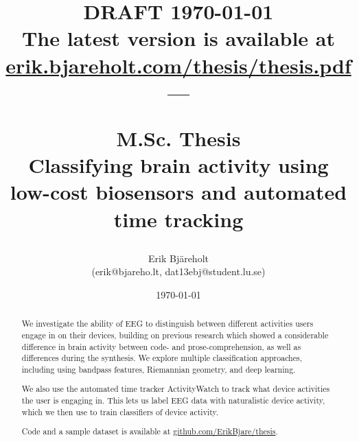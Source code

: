 \documentclass[a4paper]{article}
\title{%
    \small DRAFT \today \\
    \small The latest version is available at \href{https://erik.bjareholt.com/thesis/thesis.pdf}{erik.bjareholt.com/thesis/thesis.pdf}\\
    \large --- \\
    \large \par M.Sc. Thesis\\
    \huge Classifying brain activity using low-cost biosensors and automated time tracking \\
}
\author{Erik Bjäreholt \orcid{0000-0003-1350-9677} \\(erik@bjareho.lt, dat13ebj@student.lu.se)}
\date{\today}
\begin{document}
\maketitle

\begin{abstract}

    We investigate the ability of EEG to distinguish between different activities users engage in on their devices, building on previous research which showed a considerable difference in brain activity between code- and prose-comprehension, as well as differences during the synthesis. We explore multiple classification approaches, including using bandpass features, Riemannian geometry, and deep learning.

    We also use the automated time tracker ActivityWatch to track what device activities the user is engaging in. This lets us label EEG data with naturalistic device activity, which we then use to train classifiers of device activity.

    Code and a sample dataset is available at \href{https://github.com/ErikBjare/thesis}{github.com/ErikBjare/thesis}.

\end{abstract}

\pagebreak %

\tableofcontents


\pagebreak %
\end{document}
